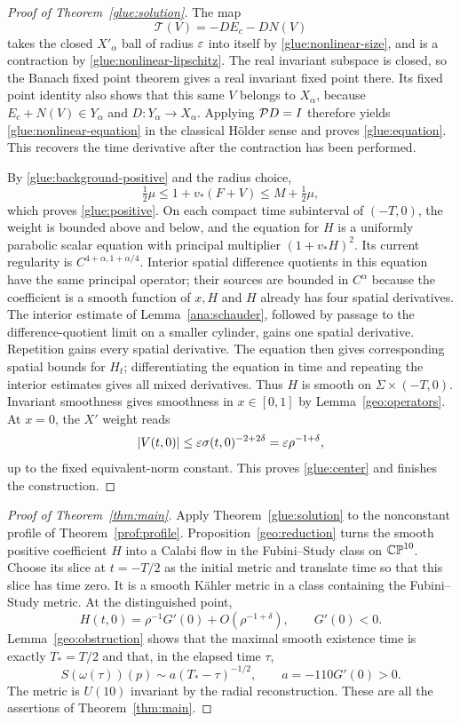 \begin{proof}[Proof of Theorem~\ref{glue:solution}]
The map
\[
 \mathcal T(V)=-DE_c-DN(V)
\]
takes the closed $X'_\alpha$ ball of radius $\varepsilon$ into itself by
\eqref{glue:nonlinear-size}, and is a contraction by
\eqref{glue:nonlinear-lipschitz}.  The real invariant subspace is
closed, so the Banach fixed point theorem gives a real invariant
fixed point there.  Its fixed point identity also shows that this
same $V$ belongs to $X_\alpha$, because $E_c+N(V)\in Y_\alpha$ and
$D:Y_\alpha\to X_\alpha$.  Applying $\mathcal P D=I$ therefore yields
\eqref{glue:nonlinear-equation} in the classical H\"older sense and
proves \eqref{glue:equation}.  This recovers the time derivative after
the contraction has been performed.

By \eqref{glue:background-positive} and the radius choice,
\[
 \tfrac12\mu\le 1+v_*(F+V)\le M+\tfrac12\mu,
\]
which proves \eqref{glue:positive}.  On each compact time subinterval
of $(-T,0)$, the weight is bounded above and below, and the equation
for $H$ is a uniformly parabolic scalar equation with principal
multiplier $(1+v_*H)^2$.  Its current regularity is
$C^{4+\alpha,1+\alpha/4}$.  Interior spatial difference quotients in
this equation have the same principal operator; their sources are
bounded in $C^\alpha$ because the coefficient is a smooth function
of $x,H$ and $H$ already has four spatial derivatives.  The interior
estimate of Lemma~\ref{ana:schauder}, followed by passage to the
difference-quotient limit on a smaller cylinder, gains one spatial
derivative.  Repetition gains every spatial derivative.  The equation
then gives corresponding spatial bounds for $H_t$; differentiating
the equation in time and repeating the interior estimates gives all
mixed derivatives.  Thus $H$ is smooth on $\Sigma\times(-T,0)$.
Invariant smoothness gives smoothness in $x\in[0,1]$ by
Lemma~\ref{geo:operators}.  At $x=0$, the $X'$ weight reads
\[
 \lvert V(t,0)\rvert\le\varepsilon\sigma(t,0)^{-2+2\delta}
                =\varepsilon\rho^{-1+\delta},
\]
up to the fixed equivalent-norm constant.  This proves
\eqref{glue:center} and finishes the construction.
\end{proof}

\begin{proof}[Proof of Theorem~\ref{thm:main}]
Apply Theorem~\ref{glue:solution} to the nonconstant profile of
Theorem~\ref{prof:profile}.  Proposition~\ref{geo:reduction} turns
the smooth positive coefficient $H$ into a Calabi flow in the
Fubini--Study class on $\mathbb{CP}^{10}$.  Choose its slice at $t=-T/2$ as
the initial metric and translate time so that this slice has time
zero.  It is a smooth K\"ahler metric in a class containing the
Fubini--Study metric.  At the distinguished point,
\[
 H(t,0)=\rho^{-1}G'(0)+O(\rho^{-1+\delta}),\qquad G'(0)<0.
\]
Lemma~\ref{geo:obstruction} shows that the maximal smooth existence
time is exactly $T_*=T/2$ and that, in the elapsed time $\tau$,
\[
 S(\omega(\tau))(p)\sim a(T_*-\tau)^{-1/2},\qquad
 a=-110G'(0)>0.
\]
The metric is $U(10)$ invariant by the radial reconstruction.
These are all the assertions of Theorem~\ref{thm:main}.
\end{proof}

